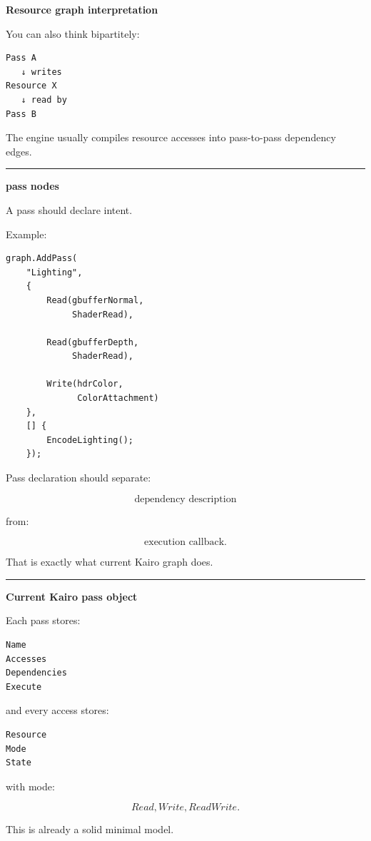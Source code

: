 \textbf{Resource graph interpretation}

You can also think bipartitely:

\begin{verbatim}
Pass A
   ↓ writes
Resource X
   ↓ read by
Pass B
\end{verbatim}

The engine usually compiles resource accesses into pass-to-pass dependency edges.

\begin{center}\rule{0.5\linewidth}{0.5pt}\end{center}

\textbf{pass nodes}

A pass should declare intent.

Example:

\begin{verbatim}
graph.AddPass(
    "Lighting",
    {
        Read(gbufferNormal,
             ShaderRead),

        Read(gbufferDepth,
             ShaderRead),

        Write(hdrColor,
              ColorAttachment)
    },
    [] {
        EncodeLighting();
    });
\end{verbatim}

Pass declaration should separate:

\[
\boxed{
\text{dependency description}
}
\]

from:

\[
\boxed{
\text{execution callback}.
}
\]

That is exactly what current Kairo graph does.

\begin{center}\rule{0.5\linewidth}{0.5pt}\end{center}

\textbf{Current Kairo pass object}

Each pass stores:

\begin{verbatim}
Name
Accesses
Dependencies
Execute
\end{verbatim}

and every access stores:

\begin{verbatim}
Resource
Mode
State
\end{verbatim}

with mode:

\[
Read,
Write,
ReadWrite.
\]

This is already a solid minimal model.


